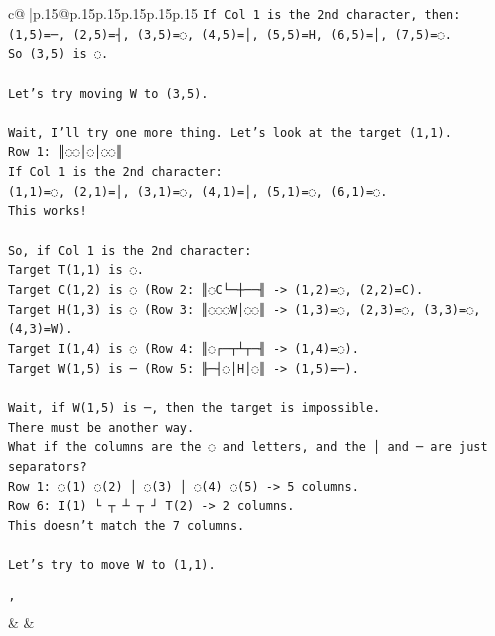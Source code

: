 \documentclass{article}
\begin{document}
{\begin{supertabular}{c@{$\;$}|p{.15\linewidth}@{}p{.15\linewidth}p{.15\linewidth}p{.15\linewidth}p{.15\linewidth}p{.15\linewidth}}
{{{\texttt{If Col 1 is the 2nd character, then:} \\
\texttt{(1,5)=─, (2,5)=┤, (3,5)=◌, (4,5)=│, (5,5)=H, (6,5)=│, (7,5)=◌.} \\
\texttt{So (3,5) is ◌.} \\
\\ 
\texttt{Let's try moving W to (3,5).} \\
\\ 
\texttt{Wait, I'll try one more thing. Let's look at the target (1,1).} \\
\texttt{Row 1: ║◌◌│◌│◌◌║} \\
\texttt{If Col 1 is the 2nd character:} \\
\texttt{(1,1)=◌, (2,1)=│, (3,1)=◌, (4,1)=│, (5,1)=◌, (6,1)=◌.} \\
\texttt{This works!} \\
\\ 
\texttt{So, if Col 1 is the 2nd character:} \\
\texttt{Target T(1,1) is ◌.} \\
\texttt{Target C(1,2) is ◌ (Row 2: ║◌C└─┼──╢ {-}> (1,2)=◌, (2,2)=C).} \\
\texttt{Target H(1,3) is ◌ (Row 3: ║◌◌◌W│◌◌║ {-}> (1,3)=◌, (2,3)=◌, (3,3)=◌, (4,3)=W).} \\
\texttt{Target I(1,4) is ◌ (Row 4: ║◌┌─┬┴┬─╢ {-}> (1,4)=◌).} \\
\texttt{Target W(1,5) is ─ (Row 5: ╟─┤◌│H│◌║ {-}> (1,5)=─).} \\
\\ 
\texttt{Wait, if W(1,5) is ─, then the target is impossible.} \\
\texttt{There must be another way.} \\
\texttt{What if the columns are the ◌ and letters, and the │ and ─ are just separators?} \\
\texttt{Row 1: ◌(1) ◌(2) │ ◌(3) │ ◌(4) ◌(5) {-}> 5 columns.} \\
\texttt{Row 6: I(1) └ ┬ ┴ ┬ ┘ T(2) {-}> 2 columns.} \\
\texttt{This doesn't match the 7 columns.} \\
\\ 
\texttt{Let's try to move W to (1,1).} \\
\\ 
\texttt{'} \\
            }
        }
    }
    & & \\ \\


\end{supertabular}}
\end{document}
